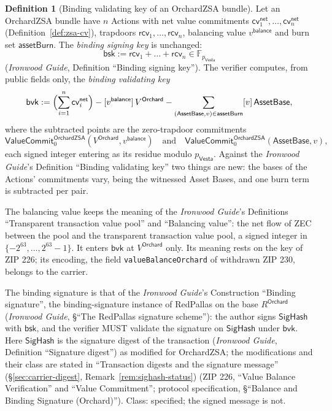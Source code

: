 \documentclass[11pt,a4paper]{article}
\theoremstyle{definition}
\newtheorem{definition}[theorem]{Definition}
\newcommand{\F}{\mathbb{F}}
\newcommand{\cvsym}{\mathsf{cv}}
\newcommand{\Vesta}{\ensuremath{\mathsf{Vesta}}}
\newcommand{\rcv}{\ensuremath{\mathsf{rcv}}}
\begin{document}
\begin{definition}[Binding validating key of an OrchardZSA bundle]
\label{def:zsa-bvk}
Let an OrchardZSA bundle have $n$ Actions with net value commitments
$\cvsym^{\mathsf{net}}_1, \dots, \cvsym^{\mathsf{net}}_n$
(Definition~\ref{def:zsa-cv}), trapdoors $\rcv_1, \dots, \rcv_n$, balancing
value $v^{\mathsf{balance}}$ and burn set $\mathsf{assetBurn}$. The
\emph{binding signing key} is unchanged:
\[
  \mathsf{bsk} := \rcv_1 + \dots + \rcv_n \in \F_{p_{\Vesta}}
\]
(\emph{Ironwood Guide}, Definition ``Binding signing key''). The verifier
computes, from public fields only, the \emph{binding validating key}
\[
  \mathsf{bvk} := \Bigl(\sum_{i=1}^{n} \cvsym^{\mathsf{net}}_i\Bigr)
    - [v^{\mathsf{balance}}]\,V^{\mathsf{Orchard}}
    - \sum_{(\mathsf{AssetBase}, v) \in \mathsf{assetBurn}}
      [v]\,\mathsf{AssetBase},
\]
where the subtracted points are the zero-trapdoor commitments
\[
  \mathsf{ValueCommit}^{\mathsf{OrchardZSA}}_{0}(V^{\mathsf{Orchard}},
    v^{\mathsf{balance}})
  \quad\text{and}\quad
  \mathsf{ValueCommit}^{\mathsf{OrchardZSA}}_{0}(\mathsf{AssetBase}, v),
\]
each signed integer entering as its residue modulo $p_{\Vesta}$. Against
the \emph{Ironwood Guide}'s Definition ``Binding validating key'' two
things are new: the bases of the Actions' commitments vary, being the
witnessed Asset Bases, and one burn term is subtracted per pair.

The balancing value keeps the meaning of the \emph{Ironwood Guide}'s
Definitions ``Transparent transaction value pool'' and ``Balancing value'':
the net flow of ZEC between the pool and the transparent transaction value
pool, a signed integer in $\{-2^{63}, \dots, 2^{63} - 1\}$. It enters
$\mathsf{bvk}$ at $V^{\mathsf{Orchard}}$ only. Its meaning rests on the
key of ZIP 226; its encoding, the field \texttt{valueBalanceOrchard} of
withdrawn ZIP 230, belongs to the carrier.

The binding signature is that of the \emph{Ironwood Guide}'s Construction
``Binding signature'', the binding-signature instance of RedPallas on the
base $R^{\mathsf{Orchard}}$ (\emph{Ironwood Guide}, \S``The RedPallas
signature scheme''): the author signs $\mathsf{SigHash}$ with
$\mathsf{bsk}$, and the verifier MUST validate the signature on
$\mathsf{SigHash}$ under $\mathsf{bvk}$. Here $\mathsf{SigHash}$ is the
signature digest of the transaction (\emph{Ironwood Guide}, Definition
``Signature digest'') as modified for OrchardZSA; the modifications and
their class are stated in ``Transaction digests and the signature message''
(\S\ref{sec:carrier-digest}, Remark~\ref{rem:sighash-status}) (ZIP 226,
``Value Balance Verification'' and ``Value Commitment''; protocol
specification, \S``Balance and Binding Signature (Orchard)''). Class:
specified; the signed message is not.
\end{definition}
\end{document}
